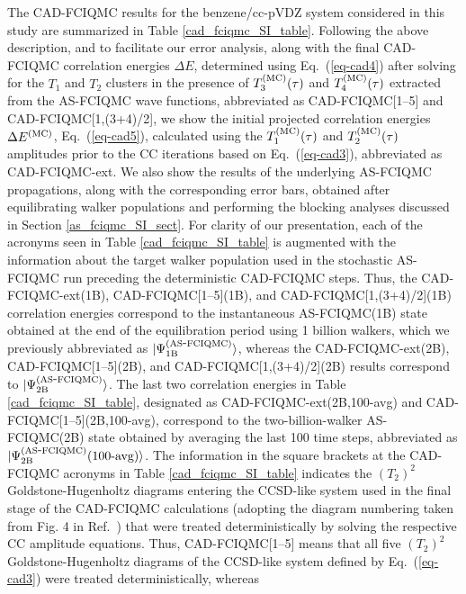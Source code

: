 \documentclass[journal=jcp,manuscript=suppinfo]{achemso}
\begin{document}
The CAD-FCIQMC results for the benzene/cc-pVDZ system considered in this study are summarized in Table
\ref{cad_fciqmc_SI_table}. Following the above description, and to facilitate our error analysis, along
with the final CAD-FCIQMC correlation energies $\Delta E$, determined using Eq.\ (\ref{eq-cad4}) after
solving for the $T_1$ and $T_2$ clusters in the presence of $T_{3}^{\rm (MC)}(\tau)$ and
$T_{4}^{\rm (MC)}(\tau)$ extracted from the AS-FCIQMC wave functions, abbreviated as CAD-FCIQMC[1--5]
and CAD-FCIQMC[1,(3+4)/2], we show the initial projected correlation energies $\Delta E^{\rm (MC)}$,
Eq.\ (\ref{eq-cad5}), calculated using the $T_{1}^{\rm (MC)}(\tau)$ and $T_{2}^{\rm (MC)}(\tau)$
amplitudes prior to the CC iterations based on Eq.\ (\ref{eq-cad3}), abbreviated as CAD-FCIQMC-ext.
We also show the results of the underlying AS-FCIQMC propagations, along with the corresponding error
bars, obtained after equilibrating walker populations and performing the blocking analyses
discussed in Section \ref{as_fciqmc_SI_sect}. For clarity of our presentation, each of the acronyms
seen in Table \ref{cad_fciqmc_SI_table} is augmented with the information about the target walker
population used in the stochastic AS-FCIQMC run preceding the deterministic CAD-FCIQMC steps. Thus,
the CAD-FCIQMC-ext(1B), CAD-FCIQMC[1--5](1B), and CAD-FCIQMC[1,(3+4)/2](1B) correlation energies
correspond to the instantaneous AS-FCIQMC(1B) state obtained at the end of the equilibration period
using 1 billion walkers, which we previously abbreviated as $|\Psi_{\rm 1B}^{\rm (AS\mbox{-}FCIQMC)}\rangle$,
whereas the CAD-FCIQMC-ext(2B), CAD-FCIQMC[1--5](2B), and CAD-FCIQMC[1,(3+4)/2](2B) results correspond to
$|\Psi_{\rm 2B}^{\rm (AS\mbox{-}FCIQMC)}\rangle$. The last two correlation energies in Table
\ref{cad_fciqmc_SI_table}, designated as CAD-FCIQMC-ext(2B,100-avg) and CAD-FCIQMC[1--5](2B,100-avg),
correspond to the two-billion-walker AS-FCIQMC(2B) state obtained by averaging the last 100 time steps,
abbreviated as $|\Psi_{\rm 2B}^{\rm (AS\mbox{-}FCIQMC)}\mbox{(100-avg)}\rangle$.
The information in the square brackets at the CAD-FCIQMC acronyms in Table \ref{cad_fciqmc_SI_table}
indicates the $(T_2)^{2}$ Goldstone-Hugenholtz diagrams entering the CCSD-like system used in the final
stage of the CAD-FCIQMC calculations (adopting the diagram numbering taken from Fig. 4 in Ref.\
) that were treated deterministically by solving the respective CC amplitude
equations. Thus, CAD-FCIQMC[1--5] means that all five $(T_2)^{2}$ Goldstone-Hugenholtz diagrams
of the CCSD-like system defined by Eq.\ (\ref{eq-cad3}) were treated deterministically, whereas
\end{document}
